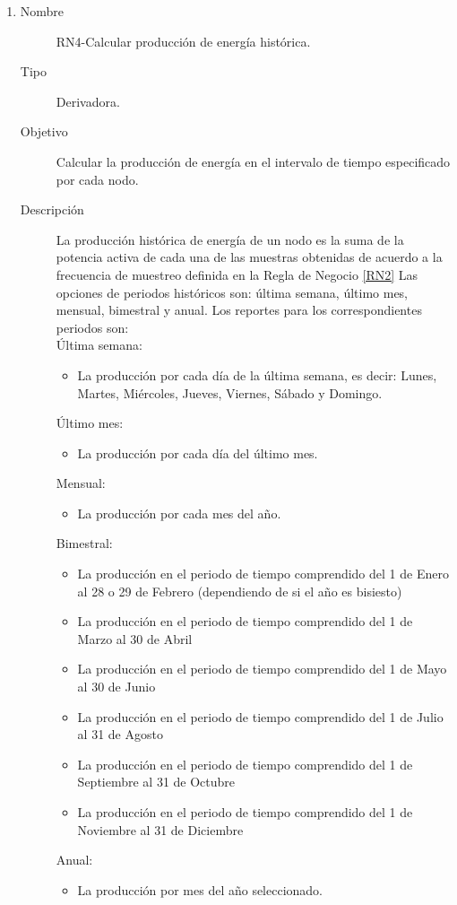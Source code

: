 \begin{enumerate}[label=RN\arabic*.]
\item \label{RN4}
		\begin{description}
			\item[Nombre] RN4-Calcular producción de energía histórica.
			\item[Tipo] Derivadora.
			\item[Objetivo] Calcular la producción de energía en el intervalo de tiempo especificado por cada nodo.
			\item[Descripción] La producción histórica de energía de un nodo es la suma de la potencia activa de cada una de las muestras obtenidas de acuerdo a la frecuencia de muestreo definida en la Regla de Negocio \ref{RN2}  
			Las opciones de periodos históricos son: última semana, último mes, mensual, bimestral y anual. Los reportes para los correspondientes periodos son:
			\\ Última semana: 
			\begin{itemize}
				\item La producción por cada día de la última semana, es decir: Lunes, Martes, Miércoles, Jueves, Viernes, Sábado y Domingo.
			\end{itemize}
			Último mes: 
			\begin{itemize}
				\item La producción por cada día del último mes.
			\end{itemize}
			Mensual: 
			\begin{itemize}
				\item La producción por cada mes del año.
			\end{itemize}
			Bimestral: 
			\begin{itemize}
				\item La producción en el periodo de tiempo comprendido del 1 de Enero al 28 o 29 de Febrero (dependiendo de si el año es bisiesto)
				\item La producción en el periodo de tiempo comprendido del 1 de Marzo al 30 de Abril
				\item La producción en el periodo de tiempo comprendido del 1 de Mayo al 30 de Junio
				\item La producción en el periodo de tiempo comprendido del 1 de Julio al 31 de Agosto
				\item La producción en el periodo de tiempo comprendido del 1 de Septiembre al 31 de Octubre
				\item La producción en el periodo de tiempo comprendido del 1 de Noviembre al 31 de Diciembre
			\end{itemize}
			Anual: 
			\begin{itemize}
				\item La producción por mes del año seleccionado.
			\end{itemize}
		\end{description}


\end{enumerate}
